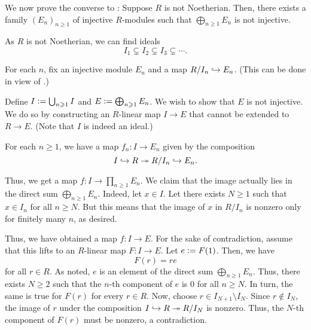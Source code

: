 \begin{ex} \label{ex:not-noetherian-direct-sum-injectives}
	We now prove the converse to : Suppose $R$ is not Noetherian. Then, there exists a family $(E_{n})_{n \ge 1}$ of injective $R$-modules such that $\bigoplus_{n \ge 1} E_{n}$ is not injective.

	As $R$ is not Noetherian, we can find ideals
	\begin{equation*} 
		I_{1} \subsetneq I_{2} \subsetneq I_{3} \subsetneq \cdots.
	\end{equation*}

	For each $n$, fix an injective module $E_{n}$ and a map $R/I_{n} \into E_{n}$. (This can be done in view of .)

	Define $I \vcentcolon= \bigcup_{n \ge 1} I$ and $E \vcentcolon= \bigoplus_{n \ge 1} E_{n}$. We wish to show that $E$ is not injective. We do so by constructing an $R$-linear map $I \to E$ that cannot be extended to $R \to E$. (Note that $I$ is indeed an ideal.)

	For each $n \ge 1$, we have a map $f_{n} : I \to E_{n}$ given by the composition
	\begin{equation*} 
		I \into R \onto R/I_{n} \into E_{n}.
	\end{equation*}

	Thus, we get a map $f : I \to \prod_{n \ge 1} E_{n}$. We claim that the image actually lies in the direct sum $\bigoplus_{n \ge 1} E_{n}$. Indeed, let $x \in I$. Let there exists $N \ge 1$ such that $x \in I_{n}$ for all $n \ge N$. But this means that the image of $x$ in $R/I_{n}$ is nonzero only for finitely many $n$, as desired.

	Thus, we have obtained a map $f : I \to E$. For the sake of contradiction, assume that this lifts to an $R$-linear map $F : I \to E$. Let $e \vcentcolon= F(1)$. Then, we have
	\begin{equation*} 
		F(r) = r e
	\end{equation*}
	for all $r \in R$. As noted, $e$ is an element of the direct sum $\bigoplus_{n \ge 1} E_{n}$. Thus, there exists $N \ge 2$ such that the $n$-th component of $e$ is $0$ for all $n \ge N$. In turn, the same is true for $F(r)$ for every $r \in R$. Now, choose $r \in I_{N + 1} \setminus I_{N}$. Since $r \notin I_{N}$, the image of $r$ under the composition $I \into R \onto R/I_{N}$ is nonzero. Thus, the $N$-th component of $F(r)$ must be nonzero, a contradiction.
\end{ex}

